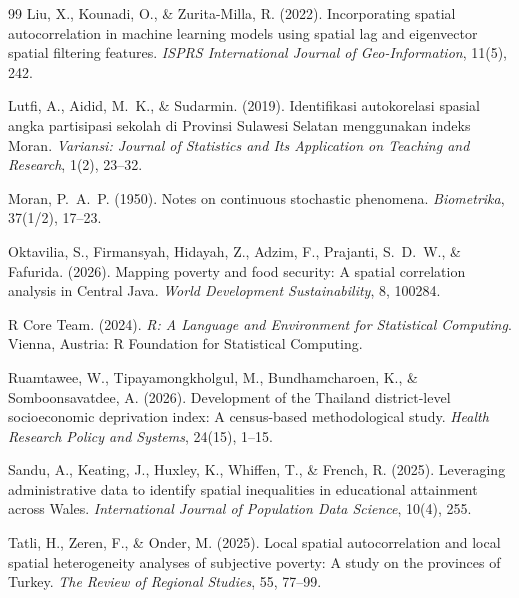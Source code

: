 \documentclass[12pt,a4paper,twoside]{article}
\begin{document}
\begin{thebibliography}{99}
Liu, X., Kounadi, O., \& Zurita-Milla, R. (2022).
Incorporating spatial autocorrelation in machine learning models using spatial
lag and eigenvector spatial filtering features.
\textit{ISPRS International Journal of Geo-Information}, 11(5), 242.

Lutfi, A., Aidid, M.~K., \& Sudarmin. (2019).
Identifikasi autokorelasi spasial angka partisipasi sekolah di {Provinsi
Sulawesi Selatan} menggunakan indeks {Moran}.
\textit{Variansi: Journal of Statistics and Its Application on Teaching and
Research}, 1(2), 23--32.

Moran, P.~A.~P. (1950).
Notes on continuous stochastic phenomena.
\textit{Biometrika}, 37(1/2), 17--23.

Oktavilia, S., Firmansyah, Hidayah, Z., Adzim, F., Prajanti, S.~D.~W.,
\& Fafurida. (2026).
Mapping poverty and food security: A spatial correlation analysis in
{Central Java}.
\textit{World Development Sustainability}, 8, 100284.

{R Core Team}. (2024).
\textit{R: A Language and Environment for Statistical Computing}.
Vienna, Austria: R Foundation for Statistical Computing.

Ruamtawee, W., Tipayamongkholgul, M., Bundhamcharoen, K.,
\& Somboonsavatdee, A. (2026).
Development of the {Thailand} district-level socioeconomic deprivation index:
A census-based methodological study.
\textit{Health Research Policy and Systems}, 24(15), 1--15.

Sandu, A., Keating, J., Huxley, K., Whiffen, T., \& French, R. (2025).
Leveraging administrative data to identify spatial inequalities in educational
attainment across {Wales}.
\textit{International Journal of Population Data Science}, 10(4), 255.

Tatli, H., Zeren, F., \& Onder, M. (2025).
Local spatial autocorrelation and local spatial heterogeneity analyses of
subjective poverty: A study on the provinces of {Turkey}.
\textit{The Review of Regional Studies}, 55, 77--99.

\end{thebibliography}
\end{document}
